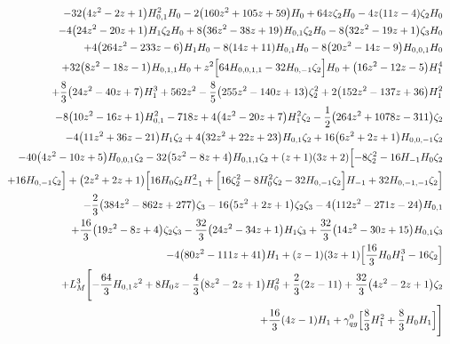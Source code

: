 \begin{eqnarray}
\nonumber \\ &&
-32 \big(4 z^2-2 z+1\big) H_{0,1}^2 H_0-2 \big(160 z^2+105 z+59\big)H_0+64  z \zeta_2 H_0-4 z (11 z-4) \zeta_2 H_0
\nonumber \\ &&
-4 \big(24z^2-20 z+1\big) H_1 \zeta_2 H_0+8 \big(36 z^2-38 z+19\big) H_{0,1}\zeta_2 H_0-8 \big(32 z^2-19 z+1\big) \zeta_3 H_0
\nonumber \\ &&
+4 \big(264 z^2-233z-6\big) H_1 H_0-8 (14 z+11) H_{0,1} H_0-8 \big(20 z^2-14 z-9\big) H_{0,0,1}H_0
\nonumber \\ &&
+32 \big(8 z^2-18 z-1\big) H_{0,1,1} H_0+z^2 \Bigl[64 H_{0,0,1,1}-32 H_{0,-1} \zeta_2\Bigr] H_0+\big(16 z^2-12 z-5\big) H_1^4
\nonumber \\ &&
+\frac{8}{3}\big(24 z^2-40 z+7\big) H_1^3+562 z^2-\frac{8}{5} \big(255 z^2-140 z+13\big)\zeta_2^2+2 \big(152 z^2-137 z+36\big) H_1^2
\nonumber \\ &&
-8 \big(10 z^2-16 z+1\big)H_{0,1}^2-718 z+4 \big(4 z^2-20 z+7\big) H_1^2 \zeta_2-\frac{1}{2}\big(264 z^2+1078 z-311\big) \zeta_2
\nonumber \\ &&
-4 \big(11 z^2+36 z-21\big) H_1\zeta_2+4 \big(32 z^2+22 z+23\big) H_{0,1} \zeta_2
+16  \big(6z^2+2 z+1\big) H_{0,0,-1} \zeta_2
\nonumber \\ &&
-40 \big(4 z^2-10 z+5\big) H_{0,0,1}\zeta_2
-32 \big(5 z^2-8 z+4\big) H_{0,1,1} \zeta_2+(z+1) (3 z+2)\Bigl[-8  \zeta_2^2-16  H_{-1} H_0 \zeta_2
\nonumber \\ &&
+16 H_{0,-1} \zeta_2\Bigr]+\big(2 z^2+2 z+1\big) \Bigl[16  H_0 \zeta_2 H_{-1}^2+\Bigl[16  \zeta_2^2
-8  H_0^2 \zeta_2-32 H_{0,-1} \zeta_2\Bigr] H_{-1}+32  H_{0,-1,-1} \zeta_2\Bigr]
\nonumber \\ &&
-\frac{2}{3} \big(384 z^2-862 z+277\big) \zeta_3-16  \big(5z^2+2 z+1\big) \zeta_2 \zeta_3
-4 \big(112 z^2-271 z-24\big) H_{0,1}
\nonumber \\ &&
+\frac{16}{3} \big(19 z^2-8 z+4\big)\zeta_2 \zeta_3-\frac{32}{3} \big(24 z^2-34 z+1\big) H_1 \zeta_3+\frac{32}{3} \big(14 z^2-30 z+15\big) H_{0,1} \zeta_3
\nonumber \\ &&
-4 \big(80 z^2-111z+41\big) H_1+(z-1) (3 z+1) \Bigl[\frac{16}{3} H_0 H_1^3-16  \zeta_2\Bigr]
\nonumber \\ &&
+L_M^3 \Biggl[-\frac{64}{3} H_{0,1} z^2+8 H_0z-\frac{4}{3} \big(8 z^2-2 z+1\big) H_0^2+\frac{2}{3} (2 z-11)+\frac{32}{3}\big(4 z^2-2 z+1\big) \zeta_2
\nonumber \\ &&
+\frac{16}{3} (4 z-1)H_1
+{\gamma}_{qg}^{0} \Bigl[\frac{8}{3} H_1^2+\frac{8}{3} H_0H_1\Bigr]\Biggr]

\end{eqnarray}
